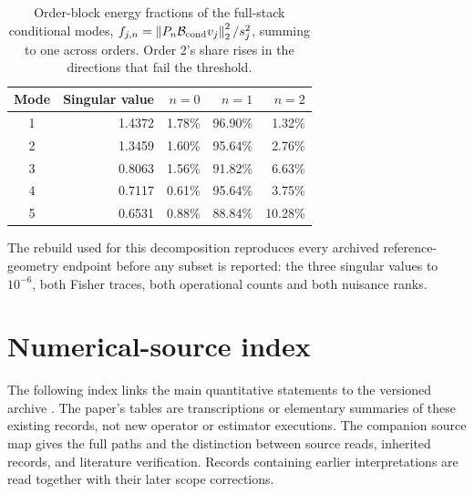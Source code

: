 \begin{table}[htbp]
\centering\small
\caption{Order-block energy fractions of the full-stack conditional modes,
$f_{j,n}=\left\lVert P_n\mathcal B_{\rm cond}v_j\right\rVert_2^2/s_j^2$, summing to one across
orders. Order 2's share rises in the directions that fail the threshold.}
\label{tab:orderenergy}
\begin{tabular}{c r r r r}
\toprule
Mode&Singular value&$n=0$&$n=1$&$n=2$\\
\midrule
1&1.4372&1.78\%&96.90\%&1.32\%\\
2&1.3459&1.60\%&95.64\%&2.76\%\\
3&0.8063&1.56\%&91.82\%&6.63\%\\
4&0.7117&0.61\%&95.64\%&3.75\%\\
5&0.6531&0.88\%&88.84\%&10.28\%\\
\bottomrule
\end{tabular}
\end{table}

The rebuild used for this decomposition reproduces every archived
reference-geometry endpoint before any subset is reported: the three singular
values to $10^{-6}$, both Fisher traces, both operational counts and both
nuisance ranks.

\section{Numerical-source index}\label{app:records}
The following index links the main quantitative statements to the versioned archive \cite{archive}. The paper's tables are transcriptions or elementary summaries of these existing records, not new operator or estimator executions. The companion source map gives the full paths and the distinction between source reads, inherited records, and literature verification. Records containing earlier interpretations are read together with their later scope corrections.

